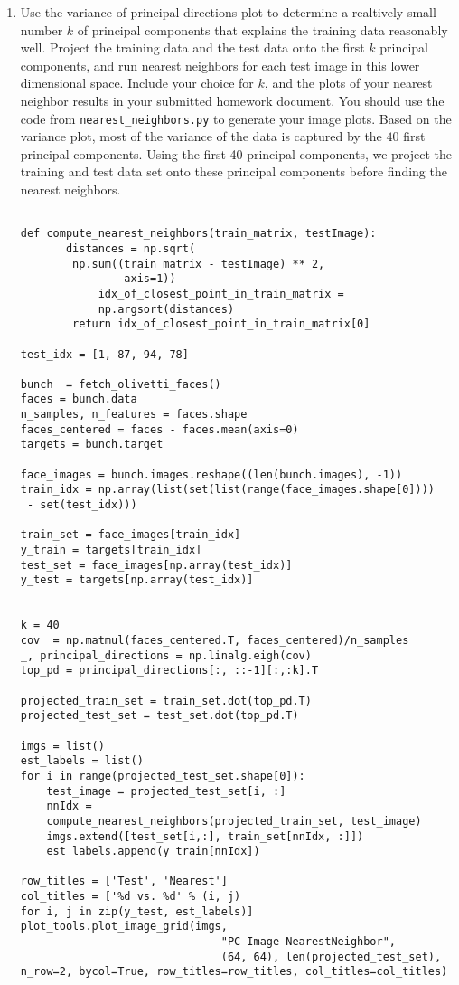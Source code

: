 \documentclass[12pt,twoside]{article}
\begin{document}
\begin{enumerate}
\begin{enumerate}
\item Use the variance of principal directions plot to determine a 
realtively small number $k$ of principal components
that explains the training data reasonably well.
Project the training data 
and the test data onto the
first $k$ principal components, and run nearest neighbors for
each test image in this lower dimensional space.  Include your
choice for $k$, and the plots
of your nearest neighbor results in your submitted homework
document.  You should use the code from
 \verb|nearest_neighbors.py| to generate your image plots.
Based on the variance plot, most of the variance of the data is captured by the $40$ first principal components. Using the first 40 principal components, we project the training
and test data set onto these principal components before finding the nearest neighbors.

\begin{verbatim} 

def compute_nearest_neighbors(train_matrix, testImage):
	   distances = np.sqrt(
	   	np.sum((train_matrix - testImage) ** 2, 
	   			axis=1))
    	    idx_of_closest_point_in_train_matrix = 
	    	np.argsort(distances)
	    return idx_of_closest_point_in_train_matrix[0]

test_idx = [1, 87, 94, 78]

bunch  = fetch_olivetti_faces()
faces = bunch.data
n_samples, n_features = faces.shape
faces_centered = faces - faces.mean(axis=0)
targets = bunch.target

face_images = bunch.images.reshape((len(bunch.images), -1))
train_idx = np.array(list(set(list(range(face_images.shape[0])))
 - set(test_idx)))

train_set = face_images[train_idx]
y_train = targets[train_idx]
test_set = face_images[np.array(test_idx)]
y_test = targets[np.array(test_idx)]


k = 40
cov  = np.matmul(faces_centered.T, faces_centered)/n_samples
_, principal_directions = np.linalg.eigh(cov)
top_pd = principal_directions[:, ::-1][:,:k].T

projected_train_set = train_set.dot(top_pd.T)
projected_test_set = test_set.dot(top_pd.T)

imgs = list()
est_labels = list()
for i in range(projected_test_set.shape[0]):
    test_image = projected_test_set[i, :]
    nnIdx =
    compute_nearest_neighbors(projected_train_set, test_image)
    imgs.extend([test_set[i,:], train_set[nnIdx, :]])
    est_labels.append(y_train[nnIdx])

row_titles = ['Test', 'Nearest']
col_titles = ['%d vs. %d' % (i, j) 
for i, j in zip(y_test, est_labels)]
plot_tools.plot_image_grid(imgs,
                               "PC-Image-NearestNeighbor",
                               (64, 64), len(projected_test_set), 
n_row=2, bycol=True, row_titles=row_titles, col_titles=col_titles)
 \end{verbatim}


\end{enumerate}
\end{enumerate}
\end{document}
